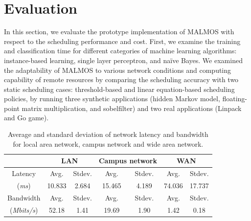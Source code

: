 \documentclass[10pt, conference, compsocconf]{IEEEtran}
\begin{document}
{{\section{Evaluation}
%
In this section, we evaluate the prototype implementation of MALMOS with
respect to the scheduling performance and cost.
%
First, we examine the training and classification time for different
categories of machine learning algorithms: instance-based learning,
single layer perceptron, and na\"{i}ve Bayes.
%
We examined the adaptability of MALMOS to various network conditions and
computing capability of remote resources by comparing the scheduling
accuracy with two static scheduling cases: threshold-based and linear
equation-based scheduling policies, by running three synthetic
applications (hidden Markov model, floating-point matrix multiplication, and
sobelfilter) and two real applications (Linpack and Go game).
%
\begin{table}
\centering
\caption{Average and standard deviation of network latency and bandwidth for local
area network, campus network and wide area network.}
	\begin{tabular}{c|cc|cc|cc}
	\hline\hline
	\ & \multicolumn{2}{c|}{LAN} & \multicolumn{2}{c|}{Campus network} &
\multicolumn{2}{c}{WAN} \\
	\hline\hline
	Latency & Avg. & Stdev. & Avg. & Stdev. & Avg. & Stdev.\\
	(\textit{ms}) & 10.833 & 2.684 & 15.465 & 4.189 & 74.036 & 17.737 \\
	\hline 
	Bandwidth & Avg. & Stdev. & Avg. & Stdev. & Avg. & Stdev. \\
    (\textit{Mbits/s}) & 52.18 & 1.41 & 19.69 & 1.90 & 1.42 & 0.18 \\ \hline
	\end{tabular}
\end{table}
%
}}
\end{document}

